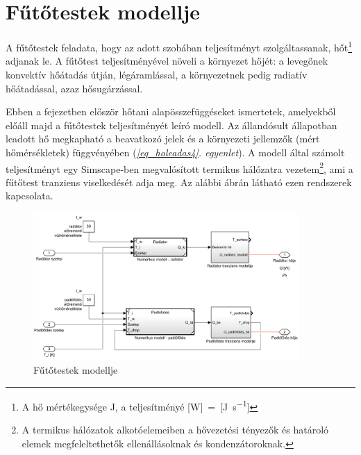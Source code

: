 \chapter{Fűtőtestek modellje}\label{chap:futotest}

A fűtőtestek feladata, hogy az adott szobában teljesítményt szolgáltassanak, hőt\footnote{A hő mértékegysége \si{\joule}, a teljesítményé [\si{\watt}]~=~[\si[per-mode=fraction]{\joule\per\second}]} adjanak le. A fűtőtest teljesítményével növeli a környezet hőjét:
a levegőnek konvektív hőátadás útján, légáramlással, a környezetnek pedig radiatív hőátadással, azaz hősugárzással.

Ebben a fejezetben először hőtani alapösszefüggéseket ismertetek, amelyekből előáll majd a fűtőtestek teljesítményét leíró modell. Az állandósult állapotban leadott hő megkapható a beavatkozó jelek és a környezeti jellemzők (mért hőmérsékletek) függvényében (\textit{\ref{eq_holeadas4}. egyenlet}).
A modell által számolt teljesítményt egy Simscape-ben megvalósított termikus hálózatra vezetem\footnote{A termikus hálózatok alkotóelemeiben a hővezetési tényezők és határoló elemek megfeleltethetők ellenállásoknak és kondenzátoroknak.}, ami a fűtőtest tranziens viselkedését adja meg. Az alábbi ábrán látható ezen rendszerek kapcsolata. 

\begin{figure}[H]
	\centering
	\includegraphics[trim=0 10 0 0, clip,width=0.9\textwidth]{figures/simscape/heatsys}
	\caption{Fűtőtestek modellje}
	\label{fig:SimscapeHeatSys}
\end{figure}



